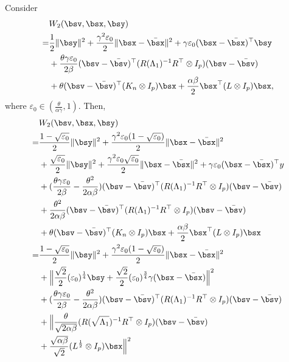 \documentclass[letterpaper, 10 pt, conference]{ieeeconf}  %
\begin{document}
Consider
\begin{align}\label{cdc18so:w2}
&W_2(\bsv,\bsx,\bsy)\nonumber\\
=&\frac{1}{2}\|\bsy\|^2+\frac{\gamma^2\varepsilon_0}{2}\|\bsx-\bar{\bsx}\|^2
+\gamma\varepsilon_0(\bsx-\bar{\bsx})^\top \bsy\nonumber\\
&+\frac{\theta\gamma\varepsilon_0}{2\beta}(\bsv-\bar{\bsv})^\top (R(\Lambda_1)^{-1}R^\top \otimes I_p)(\bsv-\bar{\bsv})\nonumber\\
&+\theta(\bsv-\bar{\bsv})^\top (K_n\otimes I_p)\bsx+\frac{\alpha\beta}{2}\bsx^\top(L\otimes I_p)\bsx,
\end{align}
where $\varepsilon_0\in(\frac{\theta}{\alpha\gamma},1)$.
Then,
\begin{align}\label{cdc18so:w2low}
&W_2(\bsv,\bsx,\bsy)\nonumber\\
=&\frac{1-\sqrt{\varepsilon_0}}{2}\|\bsy\|^2
+\frac{\gamma^2\varepsilon_0(1-\sqrt{\varepsilon_0})}{2}\|\bsx-\bar{\bsx}\|^2\nonumber\\
&+\frac{\sqrt{\varepsilon_0}}{2}\|\bsy\|^2+\frac{\gamma^2\varepsilon_0\sqrt{\varepsilon_0}}{2}
\|\bsx-\bar{\bsx}\|^2+\gamma\varepsilon_0(\bsx-\bar{\bsx})^\top y\nonumber\\
&+(\frac{\theta\gamma\varepsilon_0}{2\beta}-\frac{\theta^2}{2\alpha\beta})(\bsv-\bar{\bsv})^\top (R(\Lambda_1)^{-1}R^\top \otimes I_p)(\bsv-\bar{\bsv})\nonumber\\
&+\frac{\theta^2}{2\alpha\beta}(\bsv-\bar{\bsv})^\top (R(\Lambda_1)^{-1}R^\top \otimes I_p)(\bsv-\bar{\bsv})\nonumber\\
&+\theta(\bsv-\bar{\bsv})^\top (K_n\otimes I_p)\bsx+\frac{\alpha\beta}{2}\bsx^\top(L\otimes I_p)\bsx\nonumber\\
=&\frac{1-\sqrt{\varepsilon_0}}{2}\|\bsy\|^2
+\frac{\gamma^2\varepsilon_0(1-\sqrt{\varepsilon_0})}{2}\|\bsx-\bar{\bsx}\|^2\nonumber\\
&+\Big\|\frac{\sqrt{2}}{2}(\varepsilon_0)^{\frac{1}{4}}\bsy
+\frac{\sqrt{2}}{2}(\varepsilon_0)^{\frac{3}{4}}\gamma(\bsx-\bar{\bsx})\Big\|^2\nonumber\\
&+(\frac{\theta\gamma\varepsilon_0}{2\beta}-\frac{\theta^2}{2\alpha\beta})(\bsv-\bar{\bsv})^\top (R(\Lambda_1)^{-1}R^\top \otimes I_p)(\bsv-\bar{\bsv})\nonumber\\
&+\Big\|\frac{\theta}{\sqrt{2\alpha\beta}}(R(\sqrt{\Lambda_1})^{-1}R^\top \otimes I_p)(\bsv-\bar{\bsv})\nonumber\\
&+\frac{\sqrt{\alpha\beta}}{\sqrt{2}}(L^{\frac{1}{2}}\otimes I_p)\bsx\Big\|^2\nonumber\\

\end{align}
\end{document}

